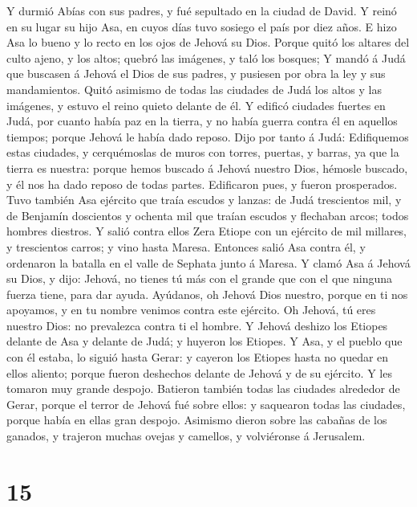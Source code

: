  Y durmió Abías con sus padres, y fué sepultado en la ciudad
de David. Y reinó en su lugar su hijo Asa, en cuyos días tuvo sosiego el
país por diez años.  E hizo Asa lo bueno y lo recto en los
ojos de Jehová su Dios.  Porque quitó los altares del culto
ajeno, y los altos; quebró las imágenes, y taló los bosques;
 Y mandó á Judá que buscasen á Jehová el Dios de sus padres,
y pusiesen por obra la ley y sus mandamientos.  Quitó
asimismo de todas las ciudades de Judá los altos y las imágenes, y
estuvo el reino quieto delante de él.  Y edificó ciudades
fuertes en Judá, por cuanto había paz en la tierra, y no había guerra
contra él en aquellos tiempos; porque Jehová le había dado reposo.
 Dijo por tanto á Judá: Edifiquemos estas ciudades, y
cerquémoslas de muros con torres, puertas, y barras, ya que la tierra es
nuestra: porque hemos buscado á Jehová nuestro Dios, hémosle buscado, y
él nos ha dado reposo de todas partes. Edificaron pues, y fueron
prosperados.  Tuvo también Asa ejército que traía escudos y
lanzas: de Judá trescientos mil, y de Benjamín doscientos y ochenta mil
que traían escudos y flechaban arcos; todos hombres diestros.
 Y salió contra ellos Zera Etiope con un ejército de mil
millares, y trescientos carros; y vino hasta Maresa. 
Entonces salió Asa contra él, y ordenaron la batalla en el valle de
Sephata junto á Maresa.  Y clamó Asa á Jehová su Dios, y
dijo: Jehová, no tienes tú más con el grande que con el que ninguna
fuerza tiene, para dar ayuda. Ayúdanos, oh Jehová Dios nuestro, porque
en ti nos apoyamos, y en tu nombre venimos contra este ejército. Oh
Jehová, tú eres nuestro Dios: no prevalezca contra ti el hombre.
 Y Jehová deshizo los Etiopes delante de Asa y delante de
Judá; y huyeron los Etiopes.  Y Asa, y el pueblo que con él
estaba, lo siguió hasta Gerar: y cayeron los Etiopes hasta no quedar en
ellos aliento; porque fueron deshechos delante de Jehová y de su
ejército. Y les tomaron muy grande despojo.  Batieron
también todas las ciudades alrededor de Gerar, porque el terror de
Jehová fué sobre ellos: y saquearon todas las ciudades, porque había en
ellas gran despojo.  Asimismo dieron sobre las cabañas de
los ganados, y trajeron muchas ovejas y camellos, y volviéronse á
Jerusalem.

\hypertarget{section-14}{%
\section{15}\label{section-14}}

